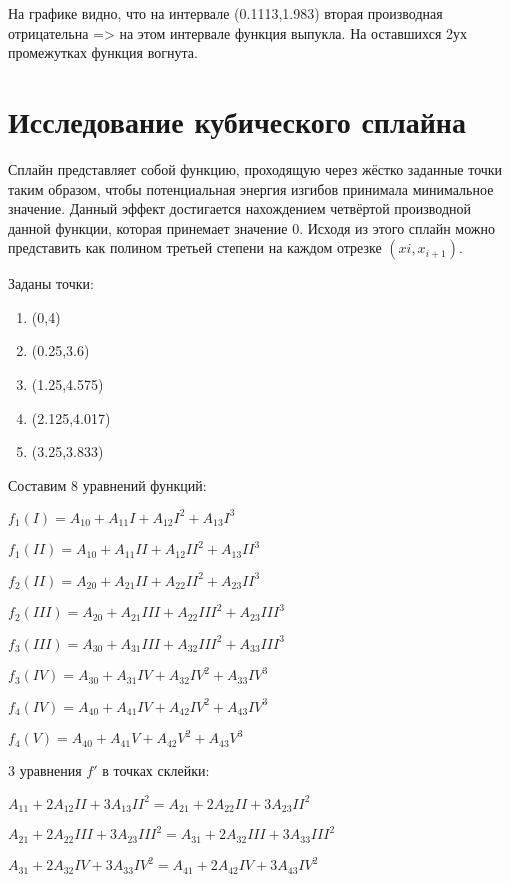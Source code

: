 \documentclass[russian,utf8,nocolumnxxxi,nocolumnxxxii]{eskdtext}
\begin{document}
\begin{enumerate}
На графике видно, что на интервале (0.1113,1.983) вторая производная отрицательна => на этом интервале функция выпукла. На оставшихся 2ух промежутках функция вогнута.
\end{enumerate}

\newpage
\section{Исследование кубического сплайна}

Сплайн представляет собой функцию, проходящую через жёстко заданные точки таким образом, чтобы потенциальная энергия изгибов принимала минимальное значение. Данный эффект достигается нахождением четвёртой производной данной функции, которая принемает значение 0. Исходя из этого сплайн можно представить как полином третьей степени на каждом отрезке $(xi,x_{i+1})$.

Заданы точки:
\begin{enumerate}[I]
    \item (0,4)
    \item (0.25,3.6)
    \item (1.25,4.575)
    \item (2.125,4.017)
    \item (3.25,3.833)
\end{enumerate}

Составим 8 уравнений функций:
\begin{center}

$f_1(I)=A_{10}+A_{11}I+A_{12}I^2+A_{13}I^3$

$f_1(II)=A_{10}+A_{11}II+A_{12}II^2+A_{13}II^3$

$f_2(II)=A_{20}+A_{21}II+A_{22}II^2+A_{23}II^3$

$f_2(III)=A_{20}+A_{21}III+A_{22}III^2+A_{23}III^3$

$f_3(III)=A_{30}+A_{31}III+A_{32}III^2+A_{33}III^3$

$f_3(IV)=A_{30}+A_{31}IV+A_{32}IV^2+A_{33}IV^3$

$f_4(IV)=A_{40}+A_{41}IV+A_{42}IV^2+A_{43}IV^3$

$f_4(V)=A_{40}+A_{41}V+A_{42}V^2+A_{43}V^3$

\end{center}

3 уравнения $f'$ в точках склейки:

\begin{center}
    
$A_{11}+2A_{12}II+3A_{13}II^2=A_{21}+2A_{22}II+3A_{23}II^2$

$A_{21}+2A_{22}III+3A_{23}III^2=A_{31}+2A_{32}III+3A_{33}III^2$

$A_{31}+2A_{32}IV+3A_{33}IV^2=A_{41}+2A_{42}IV+3A_{43}IV^2$
    
\end{center}
\end{document}
